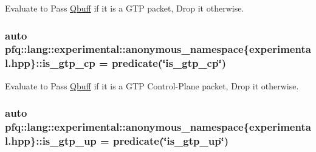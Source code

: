 Evaluate to {\ttfamily Pass} \hyperlink{structpfq_1_1lang_1_1Qbuff}{Qbuff} if it is a G\+TP packet, {\ttfamily Drop} it otherwise. 

\subsubsection[{\texorpdfstring{is\+\_\+gtp\+\_\+cp}{is_gtp_cp}}]{\setlength{\rightskip}{0pt plus 5cm}auto pfq\+::lang\+::experimental\+::anonymous\+\_\+namespace\{experimental.\+hpp\}\+::is\+\_\+gtp\+\_\+cp = {\bf predicate}(\char`\"{}is\+\_\+gtp\+\_\+cp\char`\"{})}\hypertarget{namespacepfq_1_1lang_1_1experimental_1_1anonymous__namespace_02experimental_8hpp_03_ade25d79513e3131a54a05e23d25a7539}{}\label{namespacepfq_1_1lang_1_1experimental_1_1anonymous__namespace_02experimental_8hpp_03_ade25d79513e3131a54a05e23d25a7539}


Evaluate to {\ttfamily Pass} \hyperlink{structpfq_1_1lang_1_1Qbuff}{Qbuff} if it is a G\+TP Control-\/\+Plane packet, {\ttfamily Drop} it otherwise. 

\subsubsection[{\texorpdfstring{is\+\_\+gtp\+\_\+up}{is_gtp_up}}]{\setlength{\rightskip}{0pt plus 5cm}auto pfq\+::lang\+::experimental\+::anonymous\+\_\+namespace\{experimental.\+hpp\}\+::is\+\_\+gtp\+\_\+up = {\bf predicate}(\char`\"{}is\+\_\+gtp\+\_\+up\char`\"{})}\hypertarget{namespacepfq_1_1lang_1_1experimental_1_1anonymous__namespace_02experimental_8hpp_03_a8c12f3cb8c8faaab619e0feb874ed0c3}{}\label{namespacepfq_1_1lang_1_1experimental_1_1anonymous__namespace_02experimental_8hpp_03_a8c12f3cb8c8faaab619e0feb874ed0c3}


